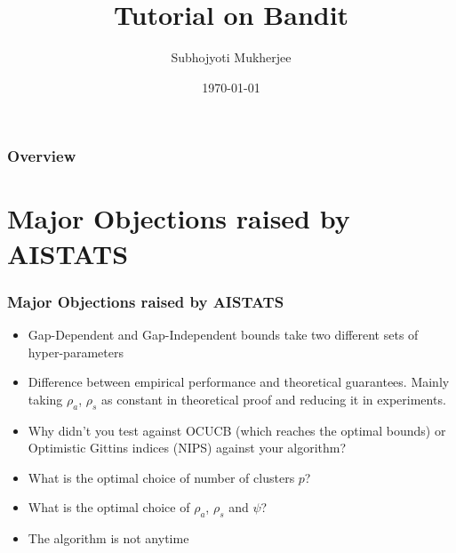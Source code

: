 \documentclass{beamer}
\title[Tutorial on Bandit]{Tutorial on Bandit} %
\author{Subhojyoti Mukherjee} %
\institute[IIT Madras] %
{
IIT Madras \\ %
\medskip
}
\date{\today} %
\begin{document}
\nocite{*}
\begin{frame}
\titlepage %
\end{frame}

\begin{frame}
\frametitle{Overview} %
\tableofcontents %
\end{frame}



\section{Major Objections raised by AISTATS} 
\begin{frame}
\frametitle{Major Objections raised by AISTATS}

\begin{itemize}
\item Gap-Dependent and Gap-Independent bounds take two different sets of hyper-parameters
\item Difference between empirical performance and theoretical guarantees. Mainly taking $\rho_a$, $\rho_s$ as constant in theoretical proof and reducing it in experiments.
\item Why didn't you test against OCUCB (which reaches the optimal bounds) or Optimistic Gittins indices (NIPS) against your algorithm?
\item What is the optimal choice of number of clusters $p$?
\item What is the optimal choice of $\rho_a$, $\rho_s$ and $\psi$?
\item The algorithm is not anytime
\end{itemize}
\end{frame}
\end{document}
